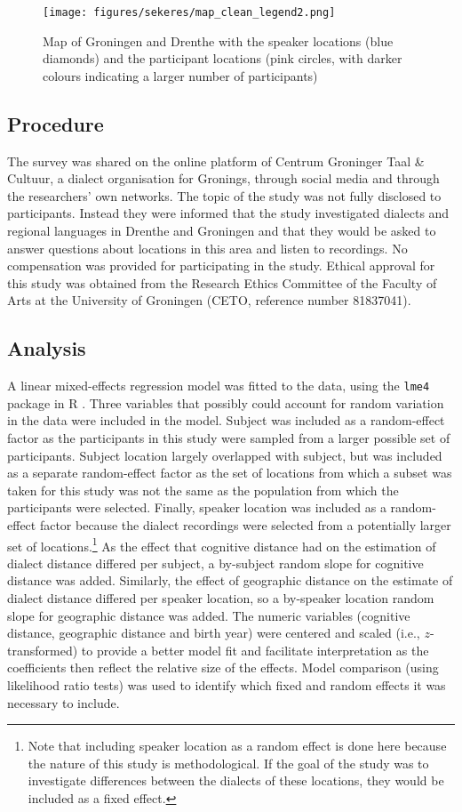 \documentclass[output=paper,colorlinks,citecolor=brown,draft]{langscibook}
\begin{document}
\begin{figure}
    \texttt{[image: figures/sekeres/map\_clean\_legend2.png]}
    \caption{Map of Groningen and Drenthe with the speaker locations (blue diamonds) and the participant locations (pink circles, with darker colours indicating a larger number of participants)}
    \label{fig:map}
\end{figure}
\newpage

\subsection{Procedure}
The survey was shared on the online platform of Centrum Groninger Taal \& Cultuur, a dialect organisation for Gronings, through social media and through the researchers' own networks. The topic of the study was not fully disclosed to participants. Instead they were informed that the study investigated dialects and regional languages in Drenthe and Groningen and that they would be asked to answer questions about locations in this area and listen to recordings. No compensation was provided for participating in the study. Ethical approval for this study was obtained from the Research Ethics Committee of the Faculty of Arts at the University of Groningen (CETO, reference number 81837041).

\subsection{Analysis}
A linear mixed-effects regression model was fitted to the data, using the \texttt{lme4} package \citep{bates_fitting_2015} in R \citep{r_core_team_r:_2020}. Three variables that possibly could account for random variation in the data were included in the model. Subject was included as a random-effect factor as the participants in this study were sampled from a larger possible set of participants. Subject location largely overlapped with subject, but was included as a separate random-effect factor as the set of locations from which a subset was taken for this study was not the same as the population from which the participants were selected. Finally, speaker location was included as a random-effect factor because the dialect recordings were selected from a potentially larger set of locations.\footnote{Note that including speaker location as a random effect is done here because the nature of this study is methodological. If the goal of the study was to investigate differences between the dialects of these locations, they would be included as a fixed effect.} As the effect that cognitive distance had on the estimation of dialect distance differed per subject, a by-subject random slope for cognitive distance was added. Similarly, the effect of geographic distance on the estimate of dialect distance differed per speaker location, so a by-speaker location random slope for geographic distance was added. The numeric variables (cognitive distance, geographic distance and birth year) were centered and scaled (i.e., $z$-transformed) to provide a better model fit and facilitate interpretation as the coefficients then reflect the relative size of the effects. Model comparison (using likelihood ratio tests) was used to identify which fixed and random effects it was necessary to include.
\end{document}
